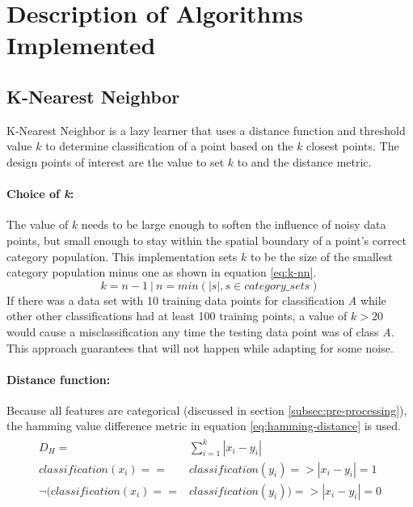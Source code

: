\section{Description of Algorithms Implemented} \label{sec:description}
\subsection{K-Nearest Neighbor}
K-Nearest Neighbor is a lazy learner that uses a distance function and threshold value $k$ to determine classification of a point based on the $k$ closest points.
The design points of interest are the value to set $k$ to and the distance metric.

\paragraph{Choice of \textit{k}:}
The value of $k$ needs to be large enough to soften the influence of noisy data points, but small enough to stay within the spatial boundary of a point's correct category population.
This implementation sets $k$ to be the size of the smallest category population minus one as shown in equation \ref{eq:k-nn}.
\begin{equation}\label{eq:k-nn}
	k = n - 1 \> | \> n = min(|s|, s \in category\_sets)
\end{equation}
If there was a data set with 10 training data points for classification \textit{A} while other other classifications had at least 100 training points, a value of $k > 20$ would cause a misclassification any time the testing data point was of class \textit{A}.
This approach guarantees that will not happen while adapting for some noise.

\paragraph{Distance function:}
Because all features are categorical (discussed in section \ref{subsec:pre-processing}), the hamming value difference metric in equation \ref{eq:hamming-distance} is used.
\begin{align}\label{eq:hamming-distance}
\begin{split}
	D_H = &\sum_{i=1}^{k}|x_i - y_i| \\
    classification(x_i) == &classification(y_i) => |x_i - y_i| = 1 \\
    \neg(classification(x_i) == &classification(y_i)) => |x_i - y_i| = 0
\end{split}
\end{align}

